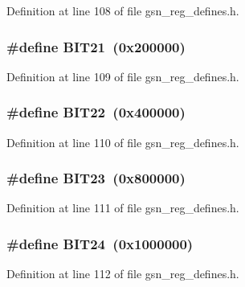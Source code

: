 Definition at line 108 of file gsn\_\-reg\_\-defines.h.

\hypertarget{a00546_a1a5b4d4ca137f11bcb2e9c381f2ea6c5}{
\subsubsection[{BIT21}]{\setlength{\rightskip}{0pt plus 5cm}\#define BIT21~(0x200000)}}
\label{a00546_a1a5b4d4ca137f11bcb2e9c381f2ea6c5}


Definition at line 109 of file gsn\_\-reg\_\-defines.h.

\hypertarget{a00546_afdaa01ee37bdcd01ea44dbab6a30fd0d}{
\subsubsection[{BIT22}]{\setlength{\rightskip}{0pt plus 5cm}\#define BIT22~(0x400000)}}
\label{a00546_afdaa01ee37bdcd01ea44dbab6a30fd0d}


Definition at line 110 of file gsn\_\-reg\_\-defines.h.

\hypertarget{a00546_ada7be80971d1875e5c4774edd3ecd97d}{
\subsubsection[{BIT23}]{\setlength{\rightskip}{0pt plus 5cm}\#define BIT23~(0x800000)}}
\label{a00546_ada7be80971d1875e5c4774edd3ecd97d}


Definition at line 111 of file gsn\_\-reg\_\-defines.h.

\hypertarget{a00546_a96cfb019bda32752ff4c8b8244aa6ea0}{
\subsubsection[{BIT24}]{\setlength{\rightskip}{0pt plus 5cm}\#define BIT24~(0x1000000)}}
\label{a00546_a96cfb019bda32752ff4c8b8244aa6ea0}


Definition at line 112 of file gsn\_\-reg\_\-defines.h.

